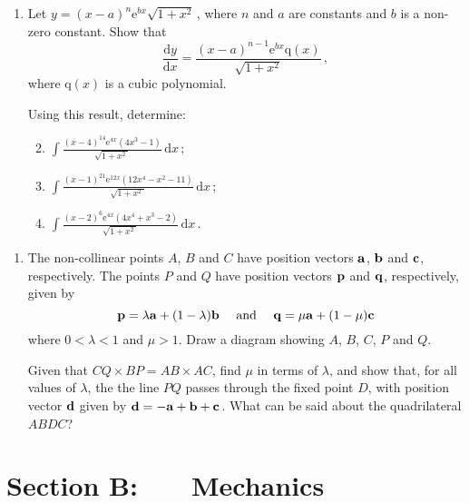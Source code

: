 \documentclass[a4, 11pt]{report}
\newlength{\qspace}
\newcounter{qnumber}
\newenvironment{question}%
 {\vspace{\qspace}
  \begin{enumerate}[\bfseries 1\quad][10]%
    \setcounter{enumi}{\value{qnumber}}%
    \item%
 }
{
  \end{enumerate}
  \filbreak
  \stepcounter{qnumber}
 }
\newenvironment{questionparts}[1][1]%
 {
  \begin{enumerate}[\bfseries (i)]%
    \setcounter{enumii}{#1}
    \addtocounter{enumii}{-1}
    \setlength{\itemsep}{5mm}
    \setlength{\parskip}{8pt}
 }
 {
  \end{enumerate}
 }
\def\d{{\mathrm d}}
\def\e{{\mathrm e}}
\def\q{{\mathrm q}}
\begin{document}
\begin{question}
Let $y= (x-a)^n \e^{bx} \sqrt{1+x^2}\,$, where $n$ and  $a$ are 
constants and $b$ is a non-zero
constant. Show that
\[
\frac{\d y}{\d x} = \frac{(x-a)^{n-1} \e^{bx} \q(x)}{\sqrt{1+x^2}}\,,
\]
where $\q(x)$ is a cubic polynomial. 

Using this result, determine:
\begin{questionparts}
\item $\displaystyle \int \frac {(x-4)^{14} \e^{4x}(4x^3-1)}
{\sqrt{1+x^2\;}} \, \d x\,;$
\item $\displaystyle \int \frac{(x-1)^{21}\e^{12x}(12x^4-x^2-11)}
{\sqrt{1+x^2\;}}\,\d x\,;$
\item $\displaystyle \int \frac{(x-2)^{6}\e^{4x}(4x^4+x^3-2)}
{\sqrt{1+x^2\;}}\,\d x\,.$

\end{questionparts}
\end{question}
		
\begin{question}
The non-collinear points $A$, $B$ and $C$ have position vectors 
$\bf a$, $\bf b$ and $\bf c$, respectively. The points $P$ and
$Q$ have position vectors $\bf p$ and $\bf q$, respectively, given by 
\[
{\bf p}= \lambda {\bf a} +(1-\lambda){\bf b}
\text{ \ \ \ and \ \ \ }
{\bf q}= \mu {\bf a} +(1-\mu){\bf c}
\]
where $0<\lambda<1$ and $\mu>1$. Draw a diagram showing $A$, $B$, $C$,
$P$ and $Q$.

Given that $CQ\times BP = AB\times AC$, find $\mu$ in terms of
$\lambda$, and show that, for all values of $\lambda$,  the 
the line  $PQ$  passes through the fixed 
point $D$, with position vector ${\bf d}$ given by
${\bf d= -a +b +c}\,$.
 What 
can be said about the quadrilateral $ABDC$?
\end{question}	
		

		
	
\newpage
\section*{Section B: \ \ \ Mechanics}
\end{document}
